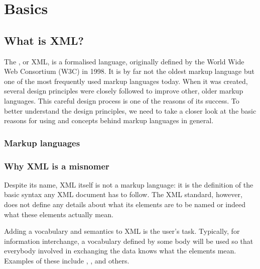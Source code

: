 \chapter{Basics}

\section{What is XML?}
\par The , or XML, is a formalised language, originally
               defined by the World Wide Web Consortium (W3C) in 1998. It is by far not the
               oldest markup language but one of the most frequently used markup languages today. When it was created,
               several design principles were closely followed to improve other, older markup languages. This careful
               design process is one of the reasons of its success. To better understand the design principles, we need
               to take a closer look at the basic reasons for using and concepts behind markup languages in general.

\subsection{Markup languages}

\subsection{Why XML is a misnomer}
\par Despite its name, XML itself is not a markup language: it is the definition of the basic syntax any
                  XML document has to follow. The XML standard, however, does not define any details about what its
                  elements are to be named or indeed what these elements actually mean.
\par Adding a vocabulary and semantics to XML is the user’s task. Typically, for information interchange, a
               vocabulary defined by some body will be used so that everybody involved in exchanging the data knows what
               the elements mean. Examples of these  include , ,
                   and others.

